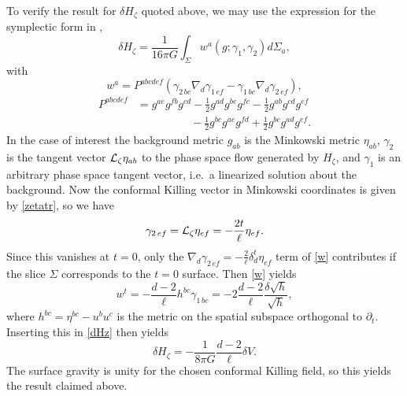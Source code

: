 \documentclass[aps,prd,showpacs,groupedaddress,nofootinbib,longbibliography,12pt]{revtex4-1}
\def\beq{\begin{equation}}
\def\eeq{\end{equation}}
\def\g{\gamma}\def\G{\Gamma}
\def\d{\delta}\def\D{\Delta}
\def\z{\zeta}
\def\half{{\textstyle{\frac{1}{2}}}}
\def\cL{{\cal L}}
\begin{document}
To verify the result for $\d H_\z$ quoted above, 
we may use the expression for the symplectic form in \cite{Hollands:2012sf},
%
\beq\label{dHz}
\d H_\z = \frac{1}{16\pi G}\int_\Sigma w^a(g; \g_1,\g_2) d\Sigma_a,
\eeq
%
with
%
\beq
w^a = P^{abcdef}(\g_{2\,bc}\nabla_d\g_{1\,ef} - \g_{1\,bc}\nabla_d\g_{2\,ef}),\label{w}
\eeq
%
%
\begin{align}
P^{abcdef} &= g^{ae}g^{fb}g^{cd}-\half g^{ad}g^{be}g^{fc} -\half g^{ab}g^{cd}g^{ef}\nonumber\\
&~~~~~~~~~~~~~~~~~~~~~~-\half g^{bc}g^{ae}g^{fd}+\half g^{bc}g^{ad}g^{ef}.
\end{align}
%
In the case of interest the background metric $g_{ab}$ is the Minkowski metric $\eta_{ab}$,
$\gamma_2$ is the tangent vector $\cL_\z \eta_{ab}$ to the phase space flow generated by 
$H_\z$, and $\gamma_1$ is an arbitrary phase space tangent vector, i.e.\ a linearized solution about the background.
Now the conformal Killing vector in Minkowski coordinates is given by \eqref{zetatr}, so we have
%
\beq
\g_{2\,ef}=\cL_\z \eta_{ef} = -\frac{2t}{\ell} \eta_{ef}.
\eeq
%
Since this vanishes at $t=0$, only the $\nabla_d\g_{2\,ef}=-\frac{2}{\ell}\delta_d^t\eta_{ef}$ 
term of \eqref{w} contributes if the slice $\Sigma$ corresponds to the $t=0$ surface.
Then \eqref{w} yields
%
\beq
w^t = -\frac{d-2}{\ell}h^{bc}\g_{1\,bc} = -2\frac{d-2}{\ell}\frac{\d \sqrt{h}}{\sqrt{h}},
\eeq
%
where $h^{bc}=\eta^{bc}-u^b u^c$ is the metric on the spatial subspace orthogonal to $\partial_t$. 
Inserting this in \eqref{dHz} then yields
%
\beq\label{dHz2}
\d H_\z = -\frac{1}{8\pi G}\frac{d-2}{\ell}\d V.
\eeq
%
The surface gravity is unity for the chosen conformal Killing field, so this yields the result
claimed above. 


\end{document}
